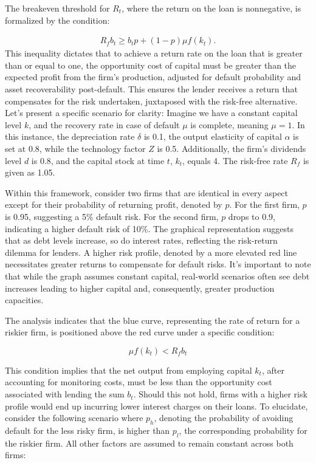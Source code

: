 \documentclass[12pt]{report}
\begin{document}
The breakeven threshold for \( R_t \), where the return on the loan is nonnegative, is formalized by the condition:

\begin{align}
    R_f b_t \geq b_t  p +(1-p) \mu  f(k_t). 
\end{align}
This inequality dictates that to achieve a return rate on the loan that is greater than or equal to one, the opportunity
cost of capital must be greater than the expected profit from the firm's production, adjusted for default probability and asset
recoverability post-default. This ensures the lender receives a return that compensates for the risk undertaken,
juxtaposed with the risk-free alternative.
Let's present a specific scenario for clarity: Imagine we have a constant capital level \(k\), and the recovery rate in
case of default \(\mu\) is complete, meaning \(\mu=1\). In this instance, the depreciation rate \(\delta\) is 0.1, the
output elasticity of capital \(\alpha\) is set at 0.8, while the technology factor \(Z\) is 0.5. Additionally, the
firm's dividends level \(d\) is 0.8, and the capital stock at time \(t\), \(k_t\), equals 4. The risk-free rate \(R_f\) is given as
1.05.

Within this framework, consider two firms that are identical in every aspect except for their probability of returning
profit, denoted by \(p\). For the first firm, \(p\) is 0.95, suggesting a 5\% default risk. For the second firm, \(p\)
drops to 0.9, indicating a higher default risk of 10\%. The graphical representation suggests that as debt levels
increase, so do interest rates, reflecting the risk-return dilemma for lenders. A higher risk profile, denoted by a more
elevated red line necessitates greater returns to compensate for default risks. It's important to note that while the
graph assumes constant capital, real-world scenarios often see debt increases leading to higher capital and,
consequently, greater production capacities.

The analysis indicates that the blue curve, representing the rate of return for a riskier firm, is positioned above the
red curve under a specific condition:

\begin{equation}
    \mu f(k_t) < R_f b_t
\end{equation}

This condition implies that the net output from employing capital \(k_t\), after accounting for monitoring costs, must
be less than the opportunity cost associated with lending the sum \(b_t\). Should this not hold, firms with a
higher risk profile would end up incurring lower interest charges on their loans. To elucidate, consider the following
scenario where \(p_h\),  denoting the probability of avoiding default for the less risky firm, is higher than \(p_l\),
the corresponding probability for the riskier firm. All other factors are assumed to remain constant across both firms:
\end{document}
